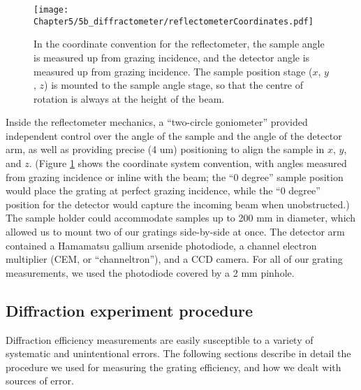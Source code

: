 \begin{figure}[htbp] %
   \centering
   \texttt{[image: Chapter5/5b\_diffractometer/reflectometerCoordinates.pdf]} 
   \caption[Reflectometer coordinates: the sample angle is measured up from grazing incidence, and the detector angle is measured up from grazing incidence.]{In the coordinate convention for the reflectometer, the sample angle is measured up from grazing incidence, and the detector angle is measured up from grazing incidence.  The sample position stage ($x$, $y$, $z$) is mounted to the sample angle stage, so that the centre of rotation is always at the height of the beam.}
   \label{reflectometerCoordinates}
\end{figure}

Inside the reflectometer mechanics, a ``two-circle goniometer'' provided independent control over the angle of the sample and the angle of the detector arm, as well as providing precise (4 um) positioning to align the sample in $x$, $y$, and $z$.  (Figure \ref{reflectometerCoordinates} shows the coordinate system convention, with angles measured from grazing incidence or inline with the beam; the ``0 degree'' sample position would place the grating at perfect grazing incidence, while the ``0 degree'' position for the detector would capture the incoming beam when unobstructed.)  The sample holder could accommodate samples up to 200 mm in diameter, which allowed us to mount two of our gratings side-by-side at once.  The detector arm contained a Hamamatsu gallium arsenide photodiode, a channel electron multiplier (CEM, or ``channeltron''), and a CCD camera. For all of our grating measurements, we used the photodiode covered by a 2 mm pinhole.

\subsection{Diffraction experiment procedure}
\label{procedure}
Diffraction efficiency measurements are easily susceptible to a variety of systematic and unintentional errors.  The following sections describe in detail the procedure we used for measuring the grating efficiency, and how we dealt with sources of error.
